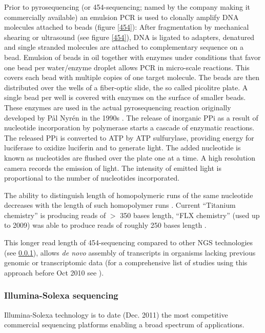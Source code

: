 Prior to pyrosequencing (or 454-sequencing; named by the company making
it commercially available) an emulsion PCR is used to clonally amplify
DNA molecules attached to beads (figure \ref{454}): After
fragmentation by mechanical shearing or ultrasound \cite{pmid20298868}
(see figure \ref{454}), DNA is ligated to adapters, denatured and
single stranded molecules are attached to complementary sequence on a
bead. Emulsion of beads in oil together with enzymes under conditions
that favor one bead per water/enzyme droplet allows PCR in
micro-scale reactions. This covers each bead with multiple copies of
one target molecule. The beads are then distributed over the wells of
a fiber-optic slide, the so called picolitre plate. A single bead per
well is covered with enzymes on the surface of smaller beads. These
enzymes are used in the actual pyrosequencing reaction originally
developed by P\r{a}l Nyr\'{e}n in the 1990s \cite{pmid17185753}. The
release of inorganic PPi as a result of nucleotide incorporation by
polymerase starts a cascade of enzymatic reactions. The released PPi
is converted to ATP by ATP sulfurylase, providing energy for
luciferase to oxidize luciferin and to generate light. The added
nucleotide is known as nucleotides are flushed over the plate one at a
time. A high resolution camera records the emission of light. The
intensity of emitted light is proportional to the number of
nucleotides incorporated.

The ability to distinguish length of homopolymeric runs of the same
nucleotide decreases with the length of such homopolymer runs
\cite{pmid21685085}. Current ``Titanium chemistry'' is producing reads
of $>$ 350 bases length, ``FLX chemistry'' (used up to 2009) was able
to produce reads of roughly 250 bases length \cite{pmid21514329}.

This longer read length of 454-sequencing \cite{pmid16056220} compared
to other NGS technologies (see \ref{sec:ill-seq}), allows \textit{de
  novo} assembly of transcripts in organisms lacking previous genomic
or transcriptomic data (for a comprehensive list of studies using this
approach before Oct 2010 see \cite{pmid20950480}).

\subsubsection{Illumina-Solexa sequencing}
\label{sec:ill-seq}

Illumina-Solexa technology is to date (Dec. 2011) the most competitive
commercial sequencing platforms enabling a broad spectrum of
applications.

